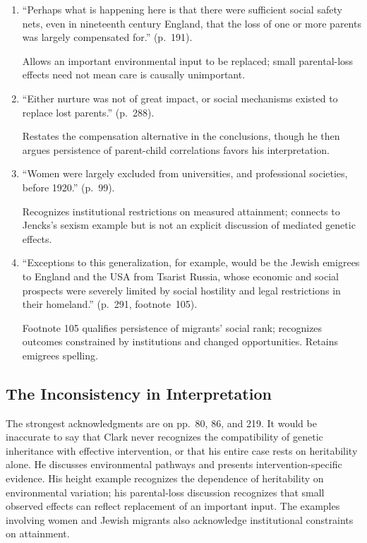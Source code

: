 \begin{enumerate}[label=\arabic*.]
Describes genetic nurture as a possible socially mediated pathway, subsequently disputes its empirical importance. Does not cover all mediation through the child's own genotype.

\item ``Perhaps what is happening here is that there were sufficient social safety nets, even in nineteenth century England, that the loss of one or more parents was largely compensated for.'' (p.~191).

Allows an important environmental input to be replaced; small parental-loss effects need not mean care is causally unimportant.

\item ``Either nurture was not of great impact, or social mechanisms existed to replace lost parents.'' (p.~288).

Restates the compensation alternative in the conclusions, though he then argues persistence of parent-child correlations favors his interpretation.

\item ``Women were largely excluded from universities, and professional societies, before 1920.'' (p.~99).

Recognizes institutional restrictions on measured attainment; connects to Jencks's sexism example but is not an explicit discussion of mediated genetic effects.

\item ``Exceptions to this generalization, for example, would be the Jewish emigrees to England and the USA from Tsarist Russia, whose economic and social prospects were severely limited by social hostility and legal restrictions in their homeland.'' (p.~291, footnote~105).

Footnote 105 qualifies persistence of migrants' social rank; recognizes outcomes constrained by institutions and changed opportunities. Retains emigrees spelling.

\end{enumerate}

\subsection{The Inconsistency in Interpretation}

The strongest acknowledgments are on pp.~80, 86, and 219. It would be
inaccurate to say that Clark never recognizes the compatibility of genetic
inheritance with effective intervention, or that his entire case rests
on heritability alone. He discusses environmental pathways and presents
intervention-specific evidence. His height example recognizes the
dependence of heritability on environmental variation; his parental-loss
discussion recognizes that small observed effects can reflect replacement
of an important input. The examples involving women and Jewish migrants
also acknowledge institutional constraints on attainment.

